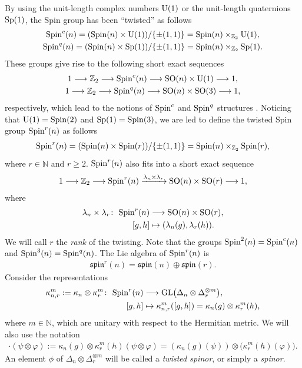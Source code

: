 \documentclass[pdftex]{sigma}
\newcommand{\lra}{\longrightarrow}
\numberwithin{equation}{section}
\begin{document}
By using the unit-length complex numbers ${\rm U}(1)$ or the unit-length quaternions ${\rm Sp}(1)$, the Spin group has been ``twisted'' as follows
\begin{gather*}
{\rm Spin}^c(n) = ({\rm Spin}(n) \times {\rm U}(1))/\{\pm (1,1)\} = {\rm Spin}(n) \times_{\mathbb{Z}_2} {\rm U}(1),\\
 {\rm Spin}^q(n) = ({\rm Spin}(n) \times {\rm Sp}(1))/\{\pm (1,1)\} = {\rm Spin}(n) \times_{\mathbb{Z}_2} {\rm Sp}(1).\end{gather*}
These groups give rise to the following short exact sequences
\begin{gather*}
1\lra \mathbb{Z}_2\lra {\rm Spin}^c(n)\lra {\rm SO}(n)\times {\rm U}(1)\lra 1,\\
1\lra \mathbb{Z}_2\lra {\rm Spin}^q(n)\lra {\rm SO}(n)\times {\rm SO}(3)\lra 1,\end{gather*}
respectively, which lead to the notions of ${\rm Spin}^c$ and ${\rm Spin}^q$ structures \cite{Friedrich,Lawson,Nagase}. Noticing that ${\rm U}(1)={\rm Spin}(2)$ and ${\rm Sp}(1)={\rm Spin}(3)$, we are led to define the twisted Spin group ${\rm Spin}^r(n)$ as follows
\begin{gather*}
{\rm Spin}^{r}(n) = ({\rm Spin}(n) \times {\rm Spin}(r))/\{\pm (1,1)\} = {\rm Spin}(n) \times_{\mathbb{Z}_2} {\rm Spin}(r),
\end{gather*}
where $r\in\mathbb{N}$ and $r\geq 2$. ${\rm Spin}^r(n)$ also fits into a short exact sequence
\begin{gather*} 1\lra \mathbb{Z}_2\lra {\rm Spin}^r(n)\xrightarrow{\lambda_n\times\lambda_r} {\rm SO}(n)\times {\rm SO}(r)\lra 1,\end{gather*}
where
\begin{align*}
 \lambda_n\times\lambda_r\colon \ {\rm Spin}^r(n)&\longrightarrow {\rm SO}(n)\times {\rm SO}(r),\\
 [g,h] &\mapsto (\lambda_n(g),\lambda_r(h)).
\end{align*}
We will call $r$ the {\em rank} of the twisting. Note that the groups ${\rm Spin}^{2}(n)={\rm Spin}^c(n)$ and ${\rm Spin}^{3}(n)={\rm Spin}^q(n)$. The Lie algebra of ${\rm Spin}^r(n)$ is
\begin{gather*} \mathfrak{spin}^r(n) = \mathfrak{spin}(n) \oplus \mathfrak{spin}(r).\end{gather*}
Consider the representations
\begin{align*}
\kappa_{n,r}^m:=\kappa_n\otimes\kappa_r^m\colon \ {\rm Spin}^r(n)&\longrightarrow {\rm GL}\big(\Delta_n\otimes \Delta_r^{\otimes m}\big),\\
 [g,h] &\mapsto \kappa_{n,r}^m([g,h])=\kappa_n(g)\otimes\kappa_r^m(h),
\end{align*}
where $m\in\mathbb{N}$, which are unitary with respect to the Hermitian metric. We will also use the notation
\begin{gather*} [g,h]\cdot(\psi\otimes\varphi) := \kappa_n(g)\otimes\kappa_r^m(h)(\psi\otimes\varphi) =
(\kappa_n(g)(\psi))\otimes\big(\kappa_r^m(h)(\varphi)\big).\end{gather*}
An element $\phi$ of $\Delta_n\otimes\Delta_r^{\otimes m}$ will be called a {\em twisted spinor}, or simply a {\em spinor}.
\end{document}
